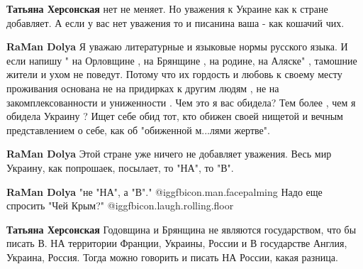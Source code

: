\begin{itemize}
\begin{itemize}
 
\textbf{Татьяна Херсонская} нет не меняет. Но уважения к Украине как к стране добавляет. А если у вас нет уважения то и писанина ваша - как кошачий чих.

 
\textbf{RaMan Dolya} Я уважаю литературные и языковые нормы русского языка. И если напишу " на Орловщине , на Брянщине , на родине, на Аляске" , тамошние жители и ухом не поведут. Потому что их гордость и любовь к своему месту проживания основана не на придирках к другим людям , не на закомплексованности и униженности . Чем это я вас обидела? Тем более , чем я обидела Украину ? Ищет себе обид тот, кто обижен своей нищетой и вечным представлением о себе, как об "обиженной м...лями жертве".

 
\textbf{RaMan Dolya} Этой стране уже ничего не добавляет уважения. Весь мир Украину, как попрошаек, посылает, то "НА", то "В".

 
\textbf{RaMan Dolya} "не "НА", а "В"."  @igg{fbicon.man.facepalming}  Надо еще спросить "Чей Крым?"  @igg{fbicon.laugh.rolling.floor} 

 
\textbf{Татьяна Херсонская} Годовщина и Брянщина не являются государством, что бы писать В. НА территории Франции, Украины, России и В государстве Англия, Украина, Россия. Тогда можно говорить и писать НА России, какая разница.


\end{itemize}
\end{itemize}
